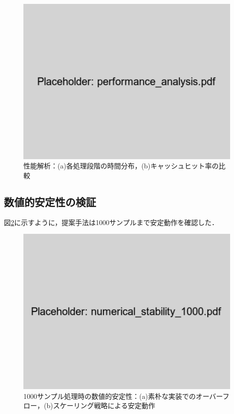 \documentclass[paper]{ieicej}
\begin{document}
\begin{figure}[t]
\centering
\includegraphics[width=0.85\linewidth]{performance_analysis.pdf}
\caption{性能解析：(a)各処理段階の時間分布，(b)キャッシュヒット率の比較}
\label{fig:performance_analysis}
\end{figure}

\subsection{数値的安定性の検証}

図\ref{fig:stability}に示すように，提案手法は1000サンプルまで安定動作を確認した．

\begin{figure}[t]
\centering
\includegraphics[width=0.85\linewidth]{numerical_stability_1000.pdf}
\caption{1000サンプル処理時の数値的安定性：(a)素朴な実装でのオーバーフロー，(b)スケーリング戦略による安定動作}
\label{fig:stability}
\end{figure}
\end{document}
